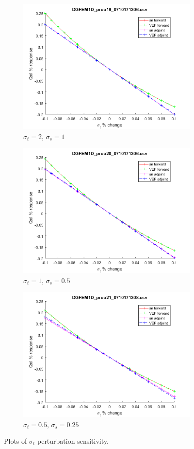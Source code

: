 \documentclass{article}
\newcommand{\sigt}{\sigma_t}
\newcommand{\sigs}{\sigma_s}
\begin{document}
\begin{figure}[H]
\label{HomoPertt}
\begin{subfigure}{.5\textwidth}
  \centering
  \includegraphics[width=.8\linewidth]{figures/19sigtSens.png}
  \caption{$\sigt=2$, $\sigs=1$}
  \label{fig:sfig1}
\end{subfigure}%
\begin{subfigure}{.5\textwidth}
  \centering
  \includegraphics[width=.8\linewidth]{figures/20sigtSens.png}
  \caption{$\sigt=1$, $\sigs=0.5$}
  \label{fig:sfig2}
\end{subfigure}
\begin{subfigure}{.5\textwidth}
  \centering
  \includegraphics[width=.8\linewidth]{figures/21sigtSens.png}
  \caption{$\sigt=0.5$, $\sigs=0.25$}
  \label{fig:sfig3}
\end{subfigure}
\caption{Plots of $\sigt$ perturbation sensitivity.}
\label{fig:fig}
\end{figure}
\end{document}
